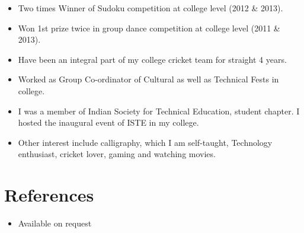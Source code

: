 \documentclass[11pt,a4paper,sans]{moderncv}        %
\begin{document}
\begin{itemize}

\item{Two times Winner of Sudoku competition at college level (2012 \& 2013).}

\vspace{8pt}

\item{Won 1st prize twice in group dance competition at college level (2011 \& 2013).}

\vspace{8pt}

\item{Have been an integral part of my college cricket team for straight 4 years.}

\vspace{8pt}

\item{Worked as Group Co-ordinator of Cultural as well as Technical Fests in college.}

\vspace{8pt}

\item{I was a member of Indian Society for Technical Education, student chapter. I hosted the inaugural event of ISTE in my college.}

\vspace{8pt}

\item{Other interest include calligraphy, which I am self-taught, Technology enthusiast, cricket lover, gaming and watching movies.}

\end{itemize}

\section{References}

\vspace{8pt}
 
\begin{itemize}

\item{Available on request}

\end{itemize}
\end{document}
